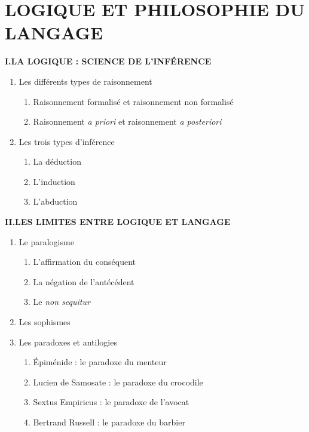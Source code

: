 \chapter{LOGIQUE ET PHILOSOPHIE DU LANGAGE}
\label{chapter-4}
\begin{keybox}
\small
\textbf{I.\quad LA LOGIQUE : SCIENCE DE L’INFÉRENCE}
\begin{enumerate}[label=\arabic*.]
\item Les différents types de raisonnement
\begin{enumerate}[label=\textcircled{\scriptsize\arabic*}]
\item Raisonnement formalisé et raisonnement non formalisé
\item Raisonnement \textit{a priori} et raisonnement \textit{a posteriori}
\end{enumerate}
\item Les trois types d’inférence
\begin{enumerate}[label=\textcircled{\scriptsize\arabic*}]
\item La déduction
\item L’induction
\item L’abduction
\end{enumerate}
\end{enumerate}
\textbf{II.\quad LES LIMITES ENTRE LOGIQUE ET LANGAGE}
\begin{enumerate}[label=\arabic*.]
\item Le paralogisme
\begin{enumerate}[label=\textcircled{\scriptsize\arabic*}]
\item L’affirmation du conséquent
\item La négation de l’antécédent
\item Le \textit{non sequitur}
\end{enumerate}
\item Les sophismes
\item Les paradoxes et antilogies
\begin{enumerate}[label=\textcircled{\scriptsize\arabic*}]
\item Épiménide : le paradoxe du menteur
\item Lucien de Samosate : le paradoxe du crocodile
\item Sextus Empiricus : le paradoxe de l’avocat
\item Bertrand Russell : le paradoxe du barbier
\end{enumerate}

\end{enumerate}
\end{keybox}
